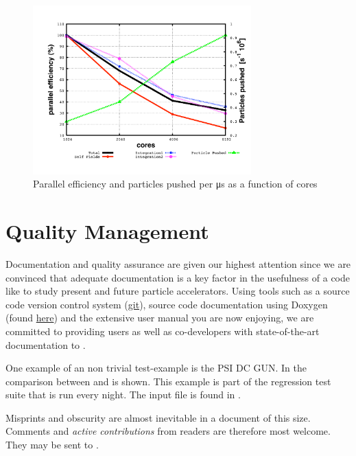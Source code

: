\begin{figure}[!htb]
\centering
\includegraphics[width=0.75\textwidth]{figures/drift2c1}
\caption{Parallel efficiency and particles pushed per \si{\micro\second} as a function of cores}
\label{fig:walldrift}
\end{figure}

\section{Quality Management}
Documentation and quality assurance are given our highest attention since we are convinced that adequate documentation
is a key factor in the usefulness of a code like \opal to study present and future particle accelerators.
 Using tools such as a source code version
control system (\href{https://git-scm.com}{git}), source code documentation using Doxygen (found \href{http://amas.web.psi.ch/docs/opal/html/}{here}) and the extensive user manual you are now enjoying, we are committed to providing users as well as co-developers with
state-of-the-art documentation to \opal.

One example of an non trivial test-example is the PSI DC GUN. In  the comparison between \impactt and \opalt is shown. This example is part of the regression test suite
that is run every night. The input file is found in .

Misprints and obscurity are almost inevitable in a document of this size.
Comments and {\em active contributions}  from readers are therefore most welcome.
They may be sent to .


